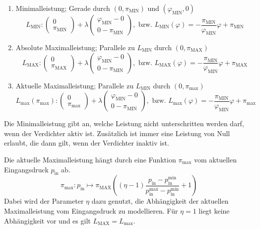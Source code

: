 \documentclass{article}
\newcommand{\piMIN}{\pi_\text{MIN}}
\newcommand{\piMAX}{\pi_\text{MAX}}
\newcommand{\pimax}{\pi_\text{max}}
\newcommand{\phiMIN}{\varphi_\text{MIN}}
\newcommand{\LMAX}{L_\text{MAX}}
\newcommand{\LMIN}{L_\text{MIN}}
\newcommand{\Lmax}{L_\text{max}}
\newcommand{\pin}{p_\text{in}}
\begin{document}
\begin{enumerate}

\item Minimalleistung; Gerade durch $(0,\piMIN)$ und $(\phiMIN,0)$
$$L_\text{MIN}: \begin{pmatrix} 0 \\ \piMIN \end{pmatrix} + \lambda \begin{pmatrix} \phiMIN - 0 \\ 0 - \piMIN \end{pmatrix},\text{ bzw. } \LMIN(\varphi)=-\frac{\piMIN}{\phiMIN}\varphi+\piMIN$$


\item Absolute Maximalleistung; Parallele zu $L_\text{MIN}$ durch $(0,\pi_{\text{MAX}})$
$$\LMAX: \begin{pmatrix} 0 \\ \pi_{\text{MAX}} \end{pmatrix} + \lambda \begin{pmatrix} \phiMIN - 0 \\ 0 - \piMIN \end{pmatrix},\text{ bzw. } L_{\text{MAX}}(\varphi)=-\frac{\piMIN}{\phiMIN}\varphi+\piMAX$$

\item Aktuelle Maximalleistung; Parallele zu $L_\text{MIN}$ durch $(0,\pimax)$
$$\Lmax(\pimax): \begin{pmatrix} 0 \\ \pimax \end{pmatrix} + \lambda \begin{pmatrix} \phiMIN - 0 \\ 0 - \piMIN \end{pmatrix},\text{ bzw. } \Lmax(\varphi)=-\frac{\piMIN}{\phiMIN}\varphi+\pimax$$


\end{enumerate}

Die Minimalleistung gibt an, welche Leistung nicht unterschritten werden darf, wenn der Verdichter aktiv ist. Zusätzlich ist immer eine Leistung von Null erlaubt, die dann gilt, wenn der Verdichter inaktiv ist.

Die aktuelle Maximalleistung hängt durch eine Funktion $\pimax$ vom aktuellen Eingangsdruck $p_\text{in}$ ab.
$$\pimax: p_\text{in} \longmapsto \piMAX \left( (\eta - 1) \frac{\pin - \pin^{\text{min}}}{\pin^{\text{max}} - \pin^{\text{min}}} + 1 \right)$$
Dabei wird der Parameter $\eta$  dazu genutzt, die Abhängigkeit der aktuellen Maximalleistung vom Eingangsdruck zu modellieren. Für $\eta=1$ liegt keine Abhängigkeit vor und es gilt $\LMAX=\Lmax $.
 
\end{document}
